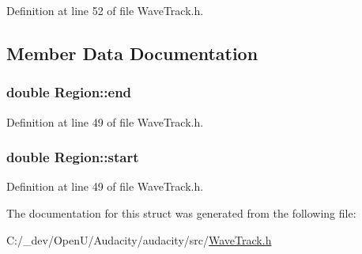 Definition at line 52 of file Wave\+Track.\+h.



\subsection{Member Data Documentation}
\subsubsection[{\texorpdfstring{end}{end}}]{\setlength{\rightskip}{0pt plus 5cm}double Region\+::end}\hypertarget{struct_region_ae97386d49f9f1ee231793ae71dd990d0}{}\label{struct_region_ae97386d49f9f1ee231793ae71dd990d0}


Definition at line 49 of file Wave\+Track.\+h.

\subsubsection[{\texorpdfstring{start}{start}}]{\setlength{\rightskip}{0pt plus 5cm}double Region\+::start}\hypertarget{struct_region_a2241d9f45df2ea4dde3bd752bcb079c0}{}\label{struct_region_a2241d9f45df2ea4dde3bd752bcb079c0}


Definition at line 49 of file Wave\+Track.\+h.



The documentation for this struct was generated from the following file\+:\begin{DoxyCompactItemize}
\item 
C\+:/\+\_\+dev/\+Open\+U/\+Audacity/audacity/src/\hyperlink{_wave_track_8h}{Wave\+Track.\+h}\end{DoxyCompactItemize}
